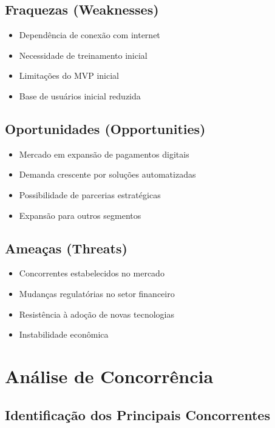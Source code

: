 \documentclass[12pt,a4paper]{article}
\begin{document}
\subsection{Fraquezas (Weaknesses)}
\begin{itemize}
    \item Dependência de conexão com internet
    \item Necessidade de treinamento inicial
    \item Limitações do MVP inicial
    \item Base de usuários inicial reduzida
\end{itemize}

\subsection{Oportunidades (Opportunities)}
\begin{itemize}
    \item Mercado em expansão de pagamentos digitais
    \item Demanda crescente por soluções automatizadas
    \item Possibilidade de parcerias estratégicas
    \item Expansão para outros segmentos
\end{itemize}

\subsection{Ameaças (Threats)}
\begin{itemize}
    \item Concorrentes estabelecidos no mercado
    \item Mudanças regulatórias no setor financeiro
    \item Resistência à adoção de novas tecnologias
    \item Instabilidade econômica
\end{itemize}

\section{Análise de Concorrência}

\subsection{Identificação dos Principais Concorrentes}
\end{document}
